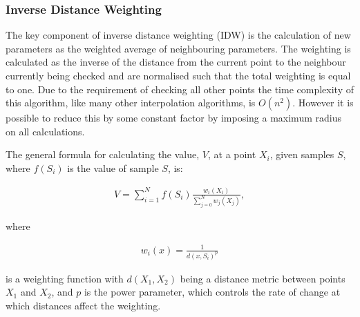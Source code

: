         \subsubsection{Inverse Distance Weighting}\label{background_interpolation_methods_inversedistanceweighting}

            The key component of inverse distance weighting (IDW) is the calculation of new parameters as the weighted average of neighbouring parameters. The weighting is calculated as the inverse of the distance from the current point to the neighbour currently being checked and are normalised such that the total weighting is equal to one. Due to the requirement of checking all other points the time complexity of this algorithm, like many other interpolation algorithms, is $O(n^{2})$. However it is possible to reduce this by some constant factor by imposing a maximum radius on all calculations. 

            The general formula for calculating the value, $V$, at a point $X_{i}$, given samples $S$, where $f(S_{i})$ is the value of sample $S$, is:

            \begin{align*}
                V = \sum_{i=1}^{N}{f(S_{i})\frac{w_{i}(X_{i})}{\sum_{j=0}^{N}{w_{j}(X_{j})}}},
            \end{align*}

            where 

            \begin{align*}
                w_{i}(x) = \frac{1}{d(x,S_{i})^{p}}
            \end{align*}

            is a weighting function with $d(X_{1},X_{2})$ being a distance metric between points $X_{1}$ and $X_{2}$, and $p$ is the power parameter, which controls the rate of change at which distances affect the weighting.

